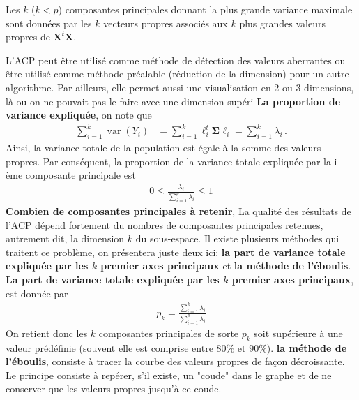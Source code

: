 \begin{theorem}
Les $k$ ($k<p$) composantes principales donnant la plus grande variance maximale sont données par les $k$ vecteurs propres associés aux $k$ plus grandes valeurs propres de $\mathbf{X}^t \mathbf{X}$.
\end{theorem}
L'ACP peut être utilisé comme méthode de détection des valeurs aberrantes ou être utilisé comme méthode préalable (réduction de la dimension)  pour un autre  algorithme.  Par ailleurs, elle permet aussi une visualisation en 2 ou 3 dimensions, là ou on ne pouvait pas le faire avec une dimension supéri\newl
\textbf{La proportion de variance expliquée}, on note que 
\begin{align*}
\sum_{i=1}^{k}\operatorname{var}\left(Y_{i}\right) &=\sum_{i=1}^{k}\ell_{i}^{t} \boldsymbol{\Sigma} \ell_{i}=\sum_{i=1}^{k}\lambda_i \,.
\end{align*}
Ainsi, la variance totale de la population est égale à la somme des valeurs propres. Par conséquent, la proportion de la variance totale expliquée par la i ème composante principale est 
\begin{align*}
0\leq \frac{\lambda_i}{\sum_{i=1}^{p}\lambda_i }\leq 1
\end{align*}
\textbf{Combien de composantes principales à retenir}, 
La qualité des résultats de l'ACP dépend fortement du nombres de composantes principales retenues, autrement dit, la dimension  $k$ du sous-espace. Il existe plusieurs méthodes qui traitent ce problème, on présentera juste deux ici: \textbf{la part de variance totale expliquée par les $k$ premier axes principaux} et \textbf{la méthode de l'éboulis}.\\
\textbf{La part de variance totale expliquée par les $k$ premier axes principaux}, est donnée par 
\begin{align*}
p_k=\frac{\sum_{i=1}^{k} \lambda_i}{\sum_{i=1}^{p}\lambda_i }
\end{align*}
On retient donc les $k$ composantes principales de sorte $p_k$  soit supérieure à une valeur prédéfinie (souvent elle est  comprise entre $80\%$ et $90\%$). \newl
\textbf{la méthode de l'éboulis}, consiste à tracer la courbe des valeurs propres de façon décroissante. Le principe consiste à repérer, s'il existe, un "coude" dans le graphe et de ne conserver que les valeurs propres jusqu'à ce coude.
